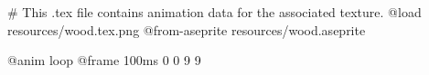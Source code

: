 # This .tex file contains animation data for the associated texture.
@load resources/wood.tex.png
@from-aseprite resources/wood.aseprite

@anim loop
	@frame 100ms 0 0 9 9
